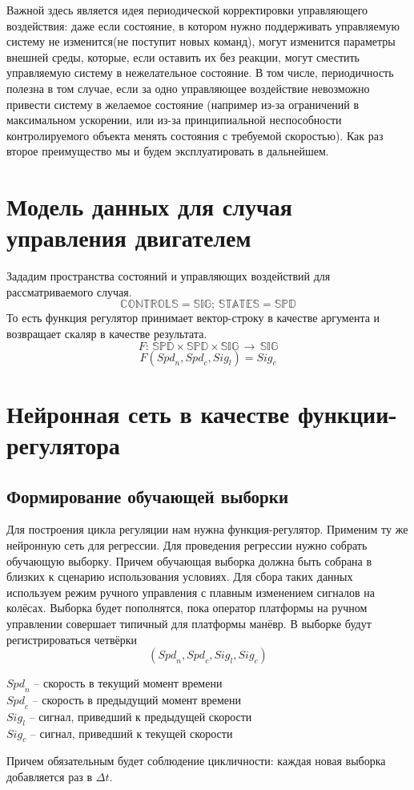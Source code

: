 \documentclass[14pt]{extreport}
\begin{document}
            Важной здесь является идея периодической корректировки управляющего воздействия: даже если состояние, в котором нужно поддерживать управляемую систему не изменится(не поступит новых команд), могут изменится параметры внешней среды, которые, если оставить их без реакции, могут сместить управляемую систему в нежелательное состояние. В том числе, периодичность полезна в том случае, если за одно управляющее воздействие невозможно привести систему в желаемое состояние (например из-за ограничений в максимальном ускорении, или из-за принципиальной неспособности контролируемого объекта менять состояния с требуемой скоростью). Как раз второе преимущество мы и будем эксплуатировать в дальнейшем.
        \section{Модель данных для случая управления двигателем}
            Зададим пространства состояний и управляющих воздействий для рассматриваемого случая.
            \[\mathbb{CONTROLS} = \mathbb{SIG};\, \mathbb{STATES} = \mathbb{SPD}\]
            То есть функция регулятор принимает вектор-строку в качестве аргумента и возвращает скаляр в качестве результата.
            \[F:\,\mathbb{SPD}\times\mathbb{SPD}\times\mathbb{SIG}\,\rightarrow\,\mathbb{SIG}\]
            \[F({Spd}_n,{Spd}_c,{Sig}_l) = {Sig}_c\]
        \section{Нейронная сеть в качестве функции-регулятора}
            \subsection{Формирование обучающей выборки}
                Для построения цикла регуляции нам нужна функция-регулятор. Применим ту же нейронную сеть для регрессии. Для проведения регрессии нужно собрать обучающую выборку. Причем обучающая выборка должна быть собрана в близких к сценарию использования условиях. Для сбора таких данных используем режим ручного управления с плавным изменением сигналов на колёсах. Выборка будет пополнятся, пока оператор платформы на ручном управлении совершает типичный для платформы манёвр. В выборке будут регистрироваться четвёрки
                    \[({Spd}_n,{Spd}_c,{Sig}_l,{Sig}_c)\]
                    \begin{center}
                      \({Spd}_n\) -- скорость в текущий момент времени\\
                      \({Spd}_c\) -- скорость в предыдущий момент времени\\
                      \({Sig}_l\) -- сигнал, приведший к предыдущей скорости\\
                      \({Sig}_c\) -- сигнал, приведший к текущей скорости\\
                    \end{center}
                Причем обязательным будет соблюдение цикличности: каждая новая выборка добавляется раз в $\Delta t$.
\end{document}
